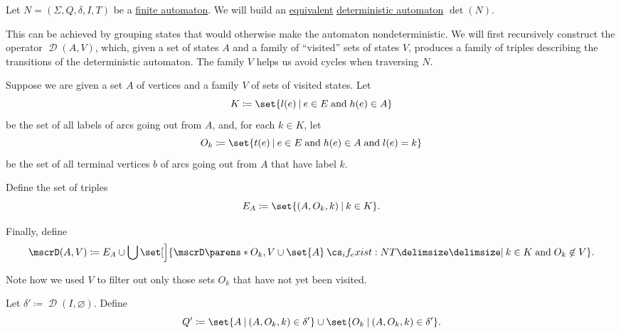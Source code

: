 \begin{algorithm}\label{alg:determinization_of_finite_automata}
  Let \( N = (\Sigma, Q, \delta, I, T) \) be a \hyperref[def:finite_automaton]{finite automaton}. We will build an \hyperref[def:finite_automaton/equivalent]{equivalent} \hyperref[def:finite_automaton/determinism]{deterministic automaton} \( \det(N) \).

  This can be achieved by grouping states that would otherwise make the automaton nondeterministic. We will first recursively construct the operator \( \mscrD(A, V) \), which, given a set of states \( A \) and a family of \enquote{visited} sets of states \( V \), produces a family of triples describing the transitions of the deterministic automaton. The family \( V \) helps us avoid cycles when traversing \( N \).

  \begin{thmenum}
     Suppose we are given a set \( A \) of vertices and a family \( V \) of sets of visited states. Let
    \begin{equation*}
      K \coloneqq \set{ l(e) \given e \in E \T{and} h(e) \in A }
    \end{equation*}
    be the set of all labels of arcs going out from \( A \), and, for each \( k \in K \), let
    \begin{equation*}
      O_k \coloneqq \set{ t(e) \given e \in E \T{and} h(e) \in A \T{and} l(e) = k }
    \end{equation*}
    be the set of all terminal vertices \( b \) of arcs going out from \( A \) that have label \( k \).

    Define the set of triples
    \begin{equation*}
      E_A \coloneqq \set{ (A, O_k, k) \given k \in K }.
    \end{equation*}

    Finally, define
    \begin{equation*}
      \mscrD(A, V) \coloneqq E_A \cup \bigcup \set[\Big]{ \mscrD\parens*{ O_k , V \cup \set{ A } } \given* k \in K \T{and} O_k \not\in V }.
    \end{equation*}

    Note how we used \( V \) to filter out only those sets \( O_k \) that have not yet been visited.

     Let \( \delta' \coloneqq \mscrD(I, \varnothing) \). Define
    \begin{equation*}
      Q' \coloneqq \set{ A \given (A, O_k, k) \in \delta' } \cup \set{ O_k \given (A, O_k, k) \in \delta' }.
    \end{equation*}


\end{thmenum}
\end{algorithm}
